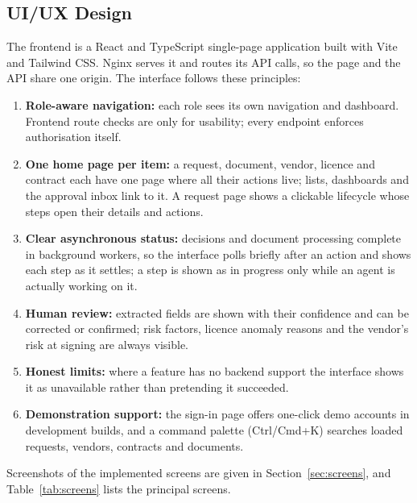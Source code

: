 \subsection{UI/UX Design}
The frontend is a React and TypeScript single-page application built with Vite and Tailwind CSS. Nginx serves it and routes its API calls, so the page and the API share one origin. The interface follows these principles:
\begin{enumerate}
  \item \textbf{Role-aware navigation:} each role sees its own navigation and dashboard. Frontend route checks are only for usability; every endpoint enforces authorisation itself.
  \item \textbf{One home page per item:} a request, document, vendor, licence and contract each have one page where all their actions live; lists, dashboards and the approval inbox link to it. A request page shows a clickable lifecycle whose steps open their details and actions.
  \item \textbf{Clear asynchronous status:} decisions and document processing complete in background workers, so the interface polls briefly after an action and shows each step as it settles; a step is shown as in progress only while an agent is actually working on it.
  \item \textbf{Human review:} extracted fields are shown with their confidence and can be corrected or confirmed; risk factors, licence anomaly reasons and the vendor's risk at signing are always visible.
  \item \textbf{Honest limits:} where a feature has no backend support the interface shows it as unavailable rather than pretending it succeeded.
  \item \textbf{Demonstration support:} the sign-in page offers one-click demo accounts in development builds, and a command palette (Ctrl/Cmd+K) searches loaded requests, vendors, contracts and documents.
\end{enumerate}
Screenshots of the implemented screens are given in Section~\ref{sec:screens}, and Table~\ref{tab:screens} lists the principal screens.

